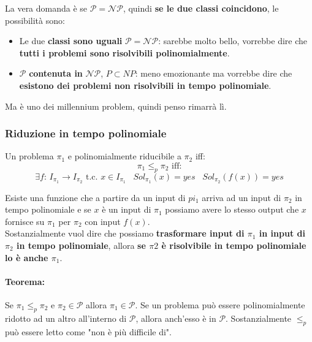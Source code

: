 La vera domanda è se $\mathcal{P} = \mathcal{NP}$, quindi \textbf{se le due classi coincidono}, le possibilità sono: 
\begin{itemize}
	\item Le due \textbf{classi sono uguali} $\mathcal{P} = \mathcal{NP}$: sarebbe molto bello, vorrebbe dire che \textbf{tutti i problemi sono risolvibili polinomialmente}.\\
	
	\item $\mathcal{P}$ \textbf{contenuta in} $\mathcal{NP}$, $P \subset NP$: meno emozionante ma vorrebbe dire che \textbf{esistono dei problemi non risolvibili in tempo polinomiale}.\\
\end{itemize}
Ma è uno dei millennium problem, quindi penso rimarrà lì.\\

\subsubsection{Riduzione in tempo polinomiale}

Un problema $\pi_1$ e polinomialmente riducibile a $\pi_2$ iff: 
$$ \pi_1 \leq_p \pi_2 \text{ iff:}$$
$$ \exists f : \, I_{\pi_1} \rightarrow I_{\pi_2} \text{ t.c. } x \in I_{\pi_1} \;\;\; Sol_{\pi_1} (x) = yes \;\;\; Sol_{\pi_2} (f(x)) = yes $$ 

Esiste una funzione che a partire da un input di $pi_1$ arriva ad un input di $\pi_2$ in tempo polinomiale e se $x$ è un input di $\pi_1$ possiamo avere lo stesso output che $x$ fornisce su $\pi_1$ per $\pi_2$ con input $f(x)$. \\

Sostanzialmente vuol dire che possiamo \textbf{trasformare input di $\pi_1$ in input di $\pi_2$ in tempo polinomiale}, allora \textbf{se $\pi 2$ è risolvibile in tempo polinomiale lo è anche $\pi_1$}.\\

\paragraph{Teorema:} Se $\pi_1 \leq_p \pi_2$ e $\pi_2 \in \mathcal{P}$ allora $\pi_1 \in \mathcal{P}$. Se un problema può essere polinomialmente ridotto ad un altro all'interno di $\mathcal{P}$, allora anch'esso è in $\mathcal{P}$. Sostanzialmente $\leq_p$ può essere letto come "non è più difficile di".\\

